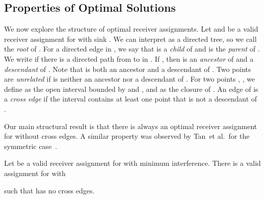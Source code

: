 \documentclass[envcountsect,envcountsame,runningheads,a4paper]{llncs}
\begin{document}
\subsection{Properties of Optimal Solutions}

We now explore the structure of optimal
receiver assignments. Let  and  be a valid receiver
assignment for  with sink . We can interpret
 as a directed tree, so we
call  the \emph{root} of .
For a directed edge  in , we say that  is a \emph{child} of 
and  is the \emph{parent} of .
We write  if there is a
directed path from  to  in .
If ,
then  is an \emph{ancestor} of  and
 a
\emph{descendant} of . Note that  is both an
ancestor and a descendant of . Two points  are \emph{unrelated}
if  is neither an ancestor nor a descendant of .
For two points , , we define 
as the open interval bounded by  and , and
 as the closure of
.
An edge  of  is a \emph{cross edge}
if the interval  contains at least one point that is
not a descendant of .

Our main structural result is that there is always an optimal
receiver assignment for  without cross edges.
A similar property was observed by Tan~et al.~for the
symmetric case~\cite{TanLoWaHuLa11}.

\begin{lemma}\label{lem:nocross}
Let  be a valid receiver assignment for  with
minimum interference.
There is a valid assignment  for  with

such that  has no cross edges.
\end{lemma}
\end{document}

